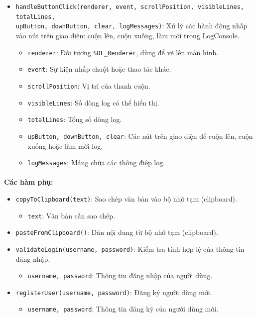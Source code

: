 \begin{itemize}
    \item \texttt{handleButtonClick(renderer, event, scrollPosition, visibleLines, totalLines,\\ upButton, downButton, clear, logMessages)}: Xử lý các hành động nhấp vào nút trên giao diện: cuộn lên, cuộn xuống, làm mới trong LogConsole.
    \begin{itemize}
        \item \texttt{renderer}: Đối tượng \texttt{SDL\_Renderer}, dùng để vẽ lên màn hình.
        \item \texttt{event}: Sự kiện nhấp chuột hoặc thao tác khác.
        \item \texttt{scrollPosition}: Vị trí của thanh cuộn.
        \item \texttt{visibleLines}: Số dòng log có thể hiển thị.
        \item \texttt{totalLines}: Tổng số dòng log.
        \item \texttt{upButton, downButton, clear}: Các nút trên giao diện để cuộn lên, cuộn xuống hoặc làm mới log.
        \item \texttt{logMessages}: Mảng chứa các thông điệp log.
    \end{itemize}

\end{itemize}

\paragraph{}{\textbf{Các hàm phụ:}}

\begin{itemize}
    \item \texttt{copyToClipboard(text)}: Sao chép văn bản vào bộ nhớ tạm (clipboard).
    \begin{itemize}
        \item \texttt{text}: Văn bản cần sao chép.
    \end{itemize}

    \item \texttt{pasteFromClipboard()}: Dán nội dung từ bộ nhớ tạm (clipboard).      

    \item \texttt{validateLogin(username, password)}: Kiểm tra tính hợp lệ của thông tin đăng nhập.
    \begin{itemize}
        \item \texttt{username, password}: Thông tin đăng nhập của người dùng.
    \end{itemize}

    \item \texttt{registerUser(username, password)}: Đăng ký người dùng mới.
    \begin{itemize}
        \item \texttt{username, password}: Thông tin đăng ký của người dùng mới.
    \end{itemize}
    
\end{itemize}